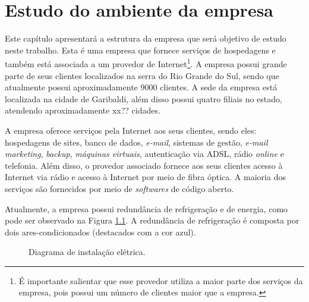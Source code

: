 \chapter{Estudo do ambiente da empresa}
\label{cap:estudodecaso}

Este capítulo apresentará a estrutura da empresa que será objetivo de estudo neste trabalho. Esta é uma empresa que fornece serviços de 
hospedagens e também está associada a um provedor de Internet\footnote[1]{É importante salientar que esse provedor utiliza a maior parte dos 
serviços da empresa, pois possui um número de clientes maior que a empresa.}. A empresa possui grande parte de seus clientes localizados na 
serra do Rio Grande do Sul, sendo que atualmente possui aproximadamente 9000 clientes. A sede da empresa está localizada na cidade de 
Garibaldi, além disso possui quatro filiais no estado, atendendo aproximadamente xx?? cidades.

A empresa oferece serviços pela Internet aos seus clientes, sendo eles: hospedagens de sites, banco de dados, \textit{e-mail}, sistemas de gestão, 
\textit{e-mail marketing}, \textit{backup}, \textit{máquinas virtuais}, autenticação via \ac{ADSL}, rádio \textit{online} e telefonia.
Além disso, o provedor associado fornece aos seus clientes acesso à Internet via rádio e acesso à Internet por meio de fibra óptica.
A maioria dos serviços são fornecidos por meio de \textit{softwares} de código aberto.

Atualmente, a empresa possui redundância de refrigeração e de energia, como pode ser observado na Figura \ref{fig:insteletrica}. 
A redundância de refrigeração é composta por dois ares-condicionados (destacados com a cor azul). 

\begin{figure}[h!]
 \centering
 \caption{Diagrama de instalação elétrica.}
 \label{fig:insteletrica}
\end{figure}

